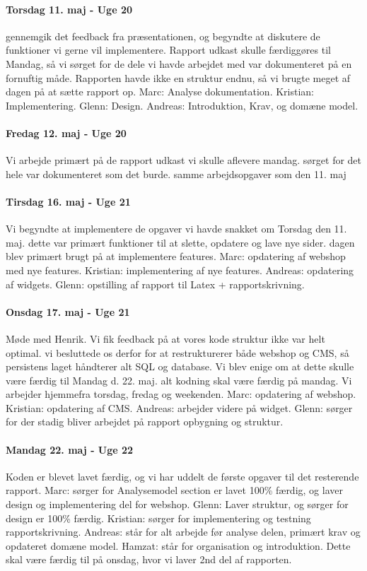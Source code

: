 \paragraph{Torsdag 11. maj - Uge 20}
gennemgik det feedback fra præsentationen, og begyndte at diskutere de funktioner vi gerne vil implementere. Rapport udkast skulle færdiggøres til Mandag, så vi sørget for de dele vi havde arbejdet med var dokumenteret på en fornuftig måde. Rapporten havde ikke en struktur endnu, så vi brugte meget af dagen på at sætte rapport op.
Marc: Analyse dokumentation.
Kristian: Implementering.
Glenn: Design.
Andreas: Introduktion, Krav, og domæne model.
 
\paragraph{Fredag 12. maj - Uge 20}
Vi arbejde primært på de rapport udkast vi skulle aflevere mandag. sørget for det hele var dokumenteret som det burde.
samme arbejdsopgaver som den 11. maj
 
\paragraph{Tirsdag 16. maj - Uge 21}
Vi begyndte at implementere de opgaver vi havde snakket om Torsdag den 11. maj. dette var primært funktioner til at slette, opdatere og lave nye sider. dagen blev primært brugt på at implementere features.
Marc: opdatering af webshop med nye features.
Kristian: implementering af nye features.
Andreas: opdatering af widgets.
Glenn: opstilling af rapport til Latex + rapportskrivning.
 
\paragraph{Onsdag 17. maj - Uge 21}
Møde med Henrik.
Vi fik feedback på at vores kode struktur ikke var helt optimal. vi besluttede os derfor for at restrukturerer både webshop og CMS, så persistens laget håndterer alt SQL og database. Vi blev enige om at dette skulle være færdig til Mandag d. 22. maj. alt kodning skal være færdig 
på mandag. Vi arbejder hjemmefra torsdag, fredag og weekenden.
Marc: opdatering af webshop.
Kristian: opdatering af CMS.
Andreas: arbejder videre på widget.
Glenn: sørger for der stadig bliver arbejdet på rapport opbygning og struktur.
 
\paragraph{Mandag 22. maj - Uge 22}
Koden er blevet lavet færdig, og vi har uddelt de første opgaver til det resterende rapport.
Marc: sørger for Analysemodel section er lavet 100\% færdig, og laver design og implementering del for webshop.
Glenn: Laver struktur, og sørger for design er 100\% færdig.
Kristian: sørger for implementering og testning rapportskrivning.
Andreas: står for alt arbejde før analyse delen, primært krav og opdateret domæne model.
Hamzat: står for organisation og introduktion.
Dette skal være færdig  til på onsdag, hvor vi laver 2nd del af rapporten.
 
